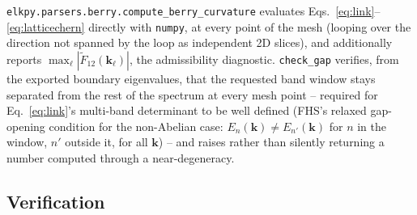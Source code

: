 \documentclass[11pt]{article}
\begin{document}
\texttt{elkpy.parsers.berry.compute\_berry\_curvature} evaluates
Eqs.~\eqref{eq:link}--\eqref{eq:latticechern} directly with \texttt{numpy}, at every
point of the mesh (looping over the direction not spanned by the loop as independent
2D slices), and additionally reports $\max_\ell |\tilde F_{12}(\mathbf k_\ell)|$, the
admissibility diagnostic. \texttt{check\_gap} verifies, from the exported boundary
eigenvalues, that the requested band window stays separated from the rest of the
spectrum at every mesh point -- required for Eq.~\eqref{eq:link}'s multi-band
determinant to be well defined (FHS's relaxed gap-opening condition for the
non-Abelian case: $E_n(\mathbf k) \ne E_{n'}(\mathbf k)$ for $n$ in the window,
$n'$ outside it, for all $\mathbf k$) -- and raises rather than silently returning a
number computed through a near-degeneracy.

\subsection{Verification}
\end{document}
